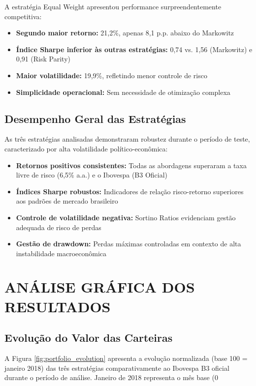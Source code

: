A estratégia Equal Weight apresentou performance surpreendentemente competitiva:

\begin{itemize}
    \item \textbf{Segundo maior retorno:} 21,2\%, apenas 8,1 p.p. abaixo do Markowitz
    \item \textbf{Índice Sharpe inferior às outras estratégias:} 0,74 vs. 1,56 (Markowitz) e 0,91 (Risk Parity)
    \item \textbf{Maior volatilidade:} 19,9\%, refletindo menor controle de risco
    \item \textbf{Simplicidade operacional:} Sem necessidade de otimização complexa
\end{itemize}

\subsection{Desempenho Geral das Estratégias}

As três estratégias analisadas demonstraram robustez durante o período de teste, caracterizado por alta volatilidade político-econômica:

\begin{itemize}
    \item \textbf{Retornos positivos consistentes:} Todas as abordagens superaram a taxa livre de risco (6,5\% a.a.) e o Ibovespa (B3 Oficial)
    \item \textbf{Índices Sharpe robustos:} Indicadores de relação risco-retorno superiores aos padrões de mercado brasileiro
    \item \textbf{Controle de volatilidade negativa:} Sortino Ratios evidenciam gestão adequada de risco de perdas
    \item \textbf{Gestão de drawdown:} Perdas máximas controladas em contexto de alta instabilidade macroeconômica
\end{itemize}

\section{ANÁLISE GRÁFICA DOS RESULTADOS}

\subsection{Evolução do Valor das Carteiras}

A Figura \ref{fig:portfolio_evolution} apresenta a evolução normalizada (base 100 = janeiro 2018) das três estratégias comparativamente ao Ibovespa B3 oficial durante o período de análise. Janeiro de 2018 representa o mês base (0%

